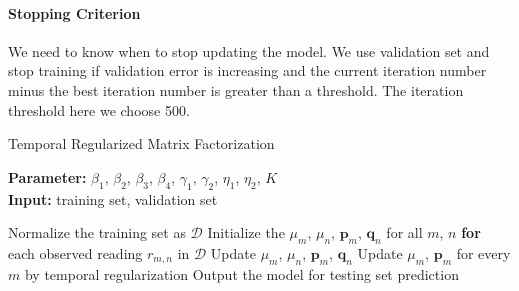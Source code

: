 \paragraph*{Stopping Criterion}

We need to know when to stop updating the model. We use validation set and stop training if validation error is increasing and the current iteration number minus the best iteration number is greater than a threshold.  The iteration threshold here we choose 500. 

\begin{algorithm}
	\caption{Temporal Regularized Matrix Factorization}
	\label{alg:TRMF}
	\textbf{Parameter:} $\beta_1$, $\beta_2$, $\beta_3$, $\beta_4$, $\gamma_1$, $\gamma_2$, $\eta_1$, $\eta_2$, $K$\\
	\textbf{Input:} training set, validation set
	\begin{algorithmic}
		\State Normalize the training set as $\mathcal{D}$
		\State Initialize the $\mu_m$, $\mu_n$, $\mathbf{p}_m$, $\mathbf{q}_n$ for all $m$, $n$
		\Repeat
			\State \textbf{for} each observed reading $r_{m,n}$ in $\mathcal{D}$
				\State \indent Update $\mu_m$, $\mu_n$, $\mathbf{p}_{m}$, $\mathbf{q}_{n}$
			\State Update $\mu_m$, $\mathbf{p}_m$ for every $m$ by temporal regularization
		\State Output the model for testing set prediction
	\end{algorithmic}
\end{algorithm}


